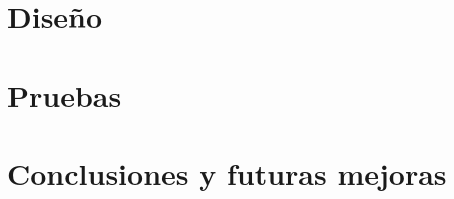 \documentclass[a4paper,12pt,twoside,final]{scrbook}
\begin{document}
\part{Diseño}









\part{Pruebas}
\part{Conclusiones y futuras mejoras}


\cleardoublepage


\renewcommand{\refname}{Bibliografía}

\clearpage
\end{document}

